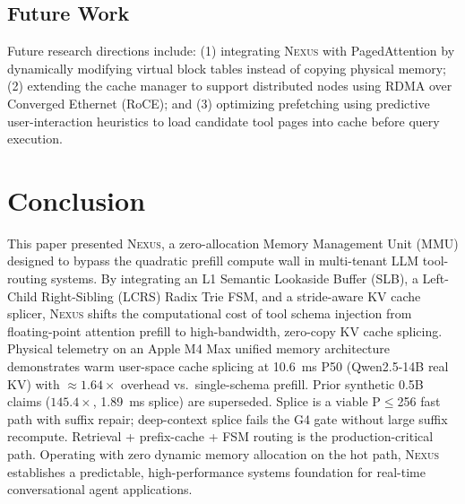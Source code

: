 \documentclass[conference,10pt]{IEEEtran}
\newcommand{\Nexus}{\textsc{Nexus}\xspace}
\begin{document}
\subsection{Future Work}
Future research directions include: (1) integrating \Nexus with PagedAttention by dynamically modifying virtual block tables instead of copying physical memory; (2) extending the cache manager to support distributed nodes using RDMA over Converged Ethernet (RoCE); and (3) optimizing prefetching using predictive user-interaction heuristics to load candidate tool pages into cache before query execution.

\section{Conclusion}
\label{sec:conclusion}

This paper presented \Nexus, a zero-allocation Memory Management Unit (MMU) designed
to bypass the quadratic prefill compute wall in multi-tenant LLM tool-routing systems.
By integrating an L1 Semantic Lookaside Buffer (SLB), a Left-Child Right-Sibling (LCRS)
Radix Trie FSM, and a stride-aware KV cache splicer, \Nexus shifts the computational cost
of tool schema injection from floating-point attention prefill to high-bandwidth,
zero-copy KV cache splicing. Physical telemetry on an Apple M4 Max unified memory
architecture demonstrates warm user-space cache splicing at \SI{10.6}{\milli\second} P50
(Qwen2.5-14B real KV) with \(\approx\!1.64\times\) overhead vs.\ single-schema prefill.
Prior synthetic 0.5B claims ($145.4\times$, \SI{1.89}{\milli\second} splice) are superseded.
Splice is a viable P$\le$256 fast path with suffix repair; deep-context splice fails the
G4 gate without large suffix recompute. Retrieval + prefix-cache + FSM routing is the
production-critical path. Operating with zero dynamic memory allocation on the hot path,
\Nexus establishes a predictable, high-performance systems foundation for real-time conversational agent applications.
\end{document}
